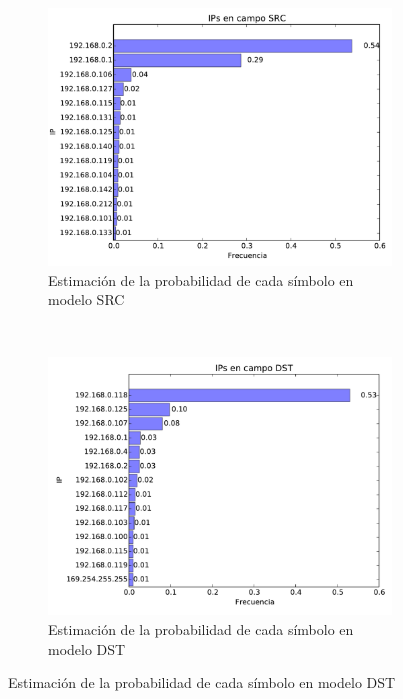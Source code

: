 \begin{figure}[H]
	\center
	\begin{subfigure}{0.4\textwidth}
		\includegraphics[width=1.0\textwidth]{resultados/empresa/ipsSrc_2_05542931604.pdf}
		\caption{Estimaci\'on de la probabilidad de cada s\'imbolo en modelo SRC}
	\end{subfigure}
	~
	\begin{subfigure}{0.4\textwidth}
		\includegraphics[width=1.0\textwidth]{resultados/empresa/ipsDst_2_99926622579.pdf}
		\caption{Estimaci\'on de la probabilidad de cada s\'imbolo en modelo DST}
	\end{subfigure}
\end{figure}

